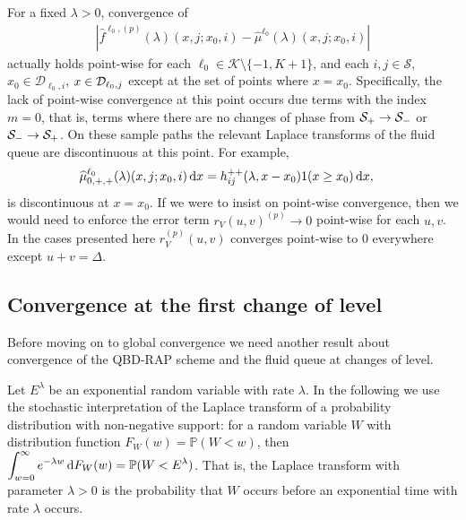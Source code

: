 \begin{rem}\label{rem: point wies}
	For a fixed \(\lambda > 0\), convergence of 
	\begin{align}
		\left|\widehat f^{\ell_0,(p)}(\lambda)(x,j;x_0,i) - \widehat \mu^{\ell_0}(\lambda)( x,j; x_0,i) \right|
	\end{align}
	actually holds point-wise for each \(\ell_0\in\mathcal K\setminus\{-1,K+1\}\), and each \(i,j\in\mathcal S,\) \(x_0\in\mathcal D_{\ell_0,i}\), \(x\in\mathcal{D}_{\ell_0,j}\) except at the set of points where \(x=x_0\). Specifically, the lack of point-wise convergence at this point occurs due terms with the index \(m=0\), that is, terms where there are no changes of phase from \(\mathcal{S}_+\to\mathcal{S}_-\) or \(\mathcal{S}_-\to \mathcal{S}_+\). On these sample paths the relevant Laplace transforms of the fluid queue are discontinuous at this point. For example, 
	\begin{align*}
		\widehat \mu^{\ell_0}_{0,+,+}(\lambda)( x,j;x_0,i) \, \mathrm{d} x&= h_{ij}^{++}(\lambda,x-x_0)1(x\geq x_0)\, \mathrm{d} x,
	\end{align*}
	is discontinuous at \(x=x_0\). If we were to insist on point-wise convergence, then we would need to enforce the error term \(r_V(u,v)^{(p)}\to 0\) point-wise for each \(u,v\). In the cases presented here \(r_V^{(p)}(u,v)\) converges point-wise to 0 everywhere except \(u+v=\Delta\). 
\end{rem}

\subsection{Convergence at the first change of level} Before moving on to global convergence we need another result about convergence of the QBD-RAP scheme and the fluid queue at changes of level. 

Let \(E^\lambda\) be an exponential random variable with rate \(\lambda\). In the following we use the stochastic interpretation of the Laplace transform of a probability distribution with non-negative support: for a random variable \(W\) with distribution function \(F_W(w)= \mathbb P(W<w)\), then \(\displaystyle\int_{w=0}^\infty e^{-\lambda w} \, \mathrm{d} F_W(w) = \mathbb P(W < E^{\lambda})\). That is, the Laplace transform with parameter \(\lambda >0\) is the probability that \(W\) occurs before an exponential time with rate \(\lambda\) occurs. 

